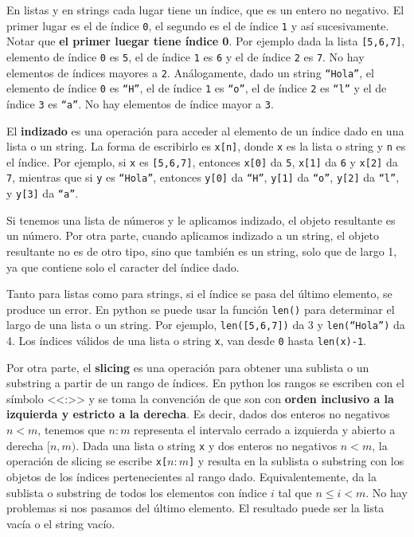 \documentclass[a4paper, 12pt]{report}
\theoremstyle{definition}
\begin{document}
En listas y en strings cada lugar tiene un índice, que es un entero no negativo. El primer lugar es el de índice {\tt 0}, el segundo es el de índice {\tt 1} y así sucesivamente. Notar que {\bf el primer luegar tiene índice 0}. Por ejemplo dada la lista {\tt [5,6,7]}, elemento de índice {\tt 0} es {\tt 5}, el de índice {\tt 1} es {\tt 6} y el de índice {\tt 2} es {\tt 7}. No hay elementos de índices mayores a {\tt 2}. Análogamente, dado un string {\tt``Hola''}, el elemento de índice {\tt 0} es {\tt ``H''}, el de índice {\tt 1} es {\tt ``o''}, el de índice {\tt 2} es {\tt``l''} y el de índice {\tt 3} es {\tt ``a''}. No hay elementos de índice mayor a {\tt 3}.

El {\bf indizado} es una operación para acceder al elemento de un índice dado en una lista o un string. La forma de escribirlo es {\tt x[n]}, donde {\tt x} es la lista o string y {\tt n} es el índice. Por ejemplo, si {\tt x} es {\tt [5,6,7]}, entonces {\tt x[0]} da {\tt 5}, {\tt x[1]} da {\tt 6} y {\tt x[2]} da {\tt 7}, mientras que si {\tt y} es {\tt``Hola''}, entonces {\tt y[0]} da {\tt ``H''}, {\tt y[1]} da {\tt ``o''}, {\tt y[2]} da {\tt ``l''}, y {\tt y[3]} da {\tt ``a''}.

Si tenemos una lista de números y le aplicamos indizado, el objeto resultante es un número. Por otra parte, cuando aplicamos indizado a un string, el objeto resultante no es de otro tipo, sino que también es un string, solo que de largo 1, ya que contiene solo el caracter del índice dado.



Tanto para listas como para strings, si el índice se pasa del último elemento, se produce un error. En python se puede usar la función {\tt len()} para determinar el largo de una lista o un string. Por ejemplo, {\tt len([5,6,7])} da 3 y {\tt len(``Hola'')} da 4. Los índices válidos de una lista o string {\tt x}, van desde {\tt 0} hasta {\tt len(x)-1}.

Por otra parte, el {\bf slicing} es una operación para obtener una sublista o un substring a partir de un rango de índices. En python los rangos se escriben con el símbolo <<:>> y se toma la convención de que son con {\bf orden inclusivo a la izquierda y estricto a la derecha}. Es decir, dados dos enteros no negativos $n<m$, tenemos que $n:m$ representa el intervalo cerrado a izquierda y abierto a derecha $[n,m)$. Dada una lista o string {\tt x} y dos enteros no negativos $n<m$, la operación de slicing se escribe {\tt x[$n:m$]} y resulta en la sublista o substring con los objetos de los índices pertenecientes al rango dado. Equivalentemente, da la sublista o substring de todos los elementos con índice $i$ tal que $n\leq i < m$. No hay problemas si nos pasamos del último elemento. El resultado puede ser la lista vacía o el string vacío.
\end{document}
